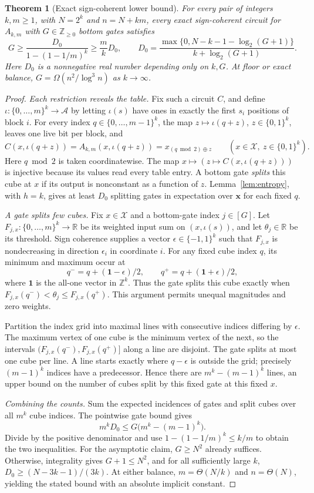 \documentclass[11pt]{article}
\newtheorem{theorem}{Theorem}[section]
\newcommand{\bits}{\{0,1\}}
\begin{document}
\begin{theorem}[Exact sign-coherent lower bound]\label{thm:coherent}
For every pair of integers $k,m\ge1$, with $N=2^k$ and $n=N+km$,
every exact sign-coherent circuit for $A_{k,m}$ with
$G\in\mathbb Z_{\ge0}$ bottom gates satisfies
$$
G\ge\frac{D_0}{1-(1-1/m)^k}\ge\frac m kD_0,
\qquad
D_0=\frac{\max\{0,N-k-1-\log_2(G+1)\}}{k+\log_2(G+1)}.
$$
Here $D_0$ is a nonnegative real number depending only on $k,G$.
At floor or exact balance, $G=\Omega(n^2/\log^3 n)$ as $k\to\infty$.
\end{theorem}
\begin{proof}
\emph{Each restriction reveals the table.}
Fix such a circuit $C$, and define
$\iota:\{0,\ldots,m\}^k\to\mathcal A$ by letting $\iota(s)$ have ones
in exactly the first $s_i$ positions of block $i$.
For every index $q\in\{0,\ldots,m-1\}^k$, the map
$z\mapsto\iota(q+z)$, $z\in\bits^k$, leaves one live bit per block, and
$$C(x,\iota(q+z))=A_{k,m}(x,\iota(q+z))
  =x_{(q\bmod2)\oplus z}\qquad(x\in\mathcal X,\ z\in\bits^k).$$
Here $q\bmod2$ is taken coordinatewise.
The map $x\mapsto(z\mapsto C(x,\iota(q+z)))$ is injective because its
values read every table entry. A bottom gate \emph{splits} this cube at
$x$ if its output is nonconstant as a function of $z$.
Lemma~\ref{lem:entropy}, with $h=k$, gives at least $D_0$ splitting gates
in expectation over $\boldsymbol{x}$ for each fixed $q$.

\emph{A gate splits few cubes.}
Fix $x\in\mathcal X$ and a bottom-gate index $j\in[G]$.
Let $F_{j,x}:\{0,\ldots,m\}^k\to\mathbb R$ be its weighted input sum
on $(x,\iota(s))$, and let $\theta_j\in\mathbb R$ be its threshold.
Sign coherence supplies a vector $\epsilon\in\{-1,1\}^k$ such that
$F_{j,x}$ is nondecreasing in direction $\epsilon_i$ in coordinate $i$.
For any fixed cube index $q$, its minimum and maximum occur at
$$q^-=q+(\mathbf1-\epsilon)/2,\qquad
q^+=q+(\mathbf1+\epsilon)/2,$$
where $\mathbf1$ is the all-one vector in $\mathbb Z^k$.
Thus the gate splits this cube exactly when
$F_{j,x}(q^-)<\theta_j\le F_{j,x}(q^+)$.
This argument permits unequal magnitudes and zero weights.

Partition the index grid into maximal lines with consecutive indices
differing by $\epsilon$. The maximum vertex of one cube is the minimum
vertex of the next, so the intervals
$(F_{j,x}(q^-),F_{j,x}(q^+)]$ along a line are disjoint.
The gate splits at most one cube per line.
A line starts exactly where $q-\epsilon$ is outside the grid; precisely
$(m-1)^k$ indices have a predecessor. Hence there are
$m^k-(m-1)^k$ lines, an upper bound on the number of cubes split by
this fixed gate at this fixed $x$.

\emph{Combining the counts.}
Sum the expected incidences of gates and split cubes over all $m^k$
cube indices. The pointwise gate bound gives
$$m^kD_0\le G\bigl(m^k-(m-1)^k\bigr).$$
Divide by the positive denominator and use
$1-(1-1/m)^k\le k/m$ to obtain the two inequalities.
For the asymptotic claim, $G\ge N^2$ already suffices. Otherwise,
integrality gives $G+1\le N^2$, and for all sufficiently large $k$,
$D_0\ge(N-3k-1)/(3k)$. At either balance,
$m=\Theta(N/k)$ and $n=\Theta(N)$, yielding the stated bound with
an absolute implicit constant.
\end{proof}
\end{document}
